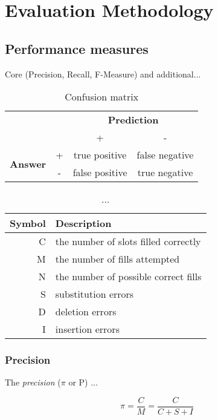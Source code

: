 \section{Evaluation Methodology}
\label{sec:evaluation-methodology}


\subsection{Performance measures}
Core (Precision, Recall, F-Measure) and additional...

\begin{table}[H]
\centering
\begin{tabular}{cccc}
	& & \multicolumn{2}{c}{\textbf{Prediction}} \\
	& & + & - \\
	\multirow{2}{*}{\textbf{Answer}} & + & true positive & false negative \\
	 & - & false positive & true negative \\
\end{tabular}
\caption{Confusion matrix}
\end{table}

\begin{table}[H]
\centering
\begin{tabular*}{\textwidth}{rl}
	\toprule
	\textbf{Symbol} & \textbf{Description} \\
	\midrule
	C & the number of slots filled correctly \\
	M & the number of fills attempted \\
	N & the number of possible correct fills  \\
	S & substitution errors \\
	D & deletion errors \\
	I & insertion errors \\
	\bottomrule
\end{tabular*}
\caption{...}
\end{table}

\subsubsection{Precision}
The \textit{precision} (\ensuremath{\pi} or P) ...

\begin{displaymath}
	\pi = \frac{C}{M} = \frac{C}{C+S+I}
\end{displaymath}

